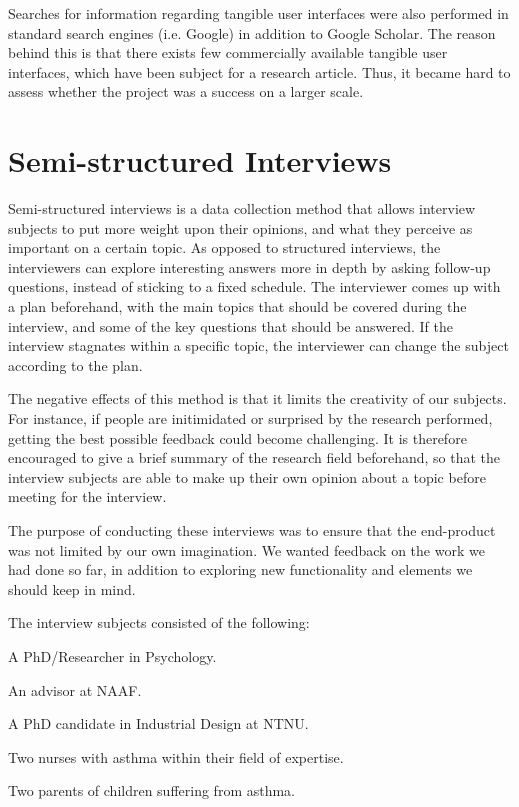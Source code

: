 Searches for information regarding tangible user interfaces were also performed in standard search engines (i.e. Google) in addition to Google Scholar. The reason behind this is that there exists few commercially available tangible user interfaces, which have been subject for a research article. Thus, it became hard to assess whether the project was a success on a larger scale. 
 
\section{Semi-structured Interviews}
\label{sec:semistructuredinterviews}

Semi-structured interviews is a data collection method that allows interview subjects to put more weight upon their opinions, and what they perceive as important on a certain topic. As opposed to structured interviews, the interviewers can explore interesting answers more in depth by asking follow-up questions, instead of sticking to a fixed schedule. The interviewer comes up with a plan beforehand, with the main topics that should be covered during the interview, and some of the key questions that should be answered. If the interview stagnates within a specific topic, the interviewer can change the subject according to the plan.

The negative effects of this method is that it limits the creativity of our subjects. For instance, if people are initimidated or surprised by the research performed, getting the best possible feedback could become challenging. It is therefore encouraged to give a brief summary of the research field beforehand, so that the interview subjects are able to make up their own opinion about a topic before meeting for the interview\cite{harrell2009data}.

The purpose of conducting these interviews was to ensure that the end-product was not limited by our own imagination. We wanted feedback on the work we had done so far, in addition to exploring new functionality and elements we should keep in mind.

The interview subjects consisted of the following: 

A PhD/Researcher in Psychology.

An advisor at NAAF.

A PhD candidate in Industrial Design at NTNU. 

Two nurses with asthma within their field of expertise.

Two parents of children suffering from asthma.    


